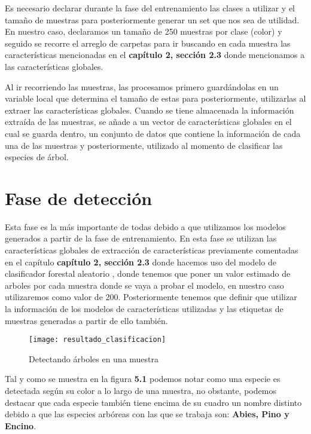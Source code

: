 Es necesario declarar durante la fase del entrenamiento las clases a utilizar y el tamaño de muestras para posteriormente generar un set que nos sea de utilidad. En nuestro caso, declaramos un tamaño de 250 muestras por clase (color) y seguido se recorre el arreglo de carpetas para ir buscando en cada muestra las características mencionadas en el \textbf{capítulo 2, sección 2.3} donde mencionamos a las características globales.

Al ir recorriendo las muestras, las procesamos primero guardándolas en un variable local que determina el tamaño de estas para posteriormente, utilizarlas al extraer las características globales. Cuando se tiene almacenada la información extraída de las muestras, se añade a un vector de características globales en el cual se guarda dentro, un conjunto de datos que contiene la información de cada una de las muestras y posteriormente, utilizado al momento de clasificar las especies de árbol. 

\section{Fase de detección}
Esta fase es la más importante de todas debido a que utilizamos los modelos generados a partir de la fase de entrenamiento. En esta fase se utilizan las características globales de extracción de características previamente comentadas en el capítulo \textbf{capítulo 2, sección 2.3} donde hacemos uso del modelo de clasificador forestal aleatorio , donde tenemos que poner un valor estimado de arboles por cada muestra donde se vaya a probar el modelo, en nuestro caso utilizaremos como valor de 200. Posteriormente tenemos que definir que utilizar la información de los modelos de características utilizadas y las etiquetas de muestras generadas a partir de ello también. 
\\

\begin{figure}[H]
  \centering
  \begin{minipage}[b]{0.8\textwidth}
        \texttt{[image: resultado\_clasificacion]}
    \caption{Detectando árboles en una muestra}
  \end{minipage}
\end{figure}

Tal y como se muestra en la figura \textbf{5.1}  podemos notar como una especie es detectada según su color a lo largo de una muestra, no obstante, podemos destacar que cada especie también tiene encima de su cuadro un nombre distinto debido a que las especies arbóreas con las que se trabaja son: \textbf{Abies, Pino y Encino}. 

